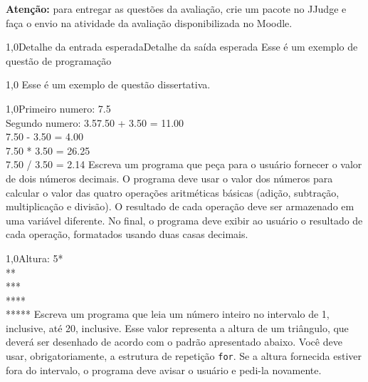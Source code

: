 \documentclass[
    12pt,     
    openright,
    twoside,  
    a4paper,  
    english,  
    brazil,   
]{memoir}
\begin{document}
\mainmatter



\textbf{Atenção:} para entregar as questões da avaliação, crie um pacote no JJudge e faça o envio na atividade da avaliação disponibilizada no Moodle.



\begin{questaoProgramacao}{1,0}{Detalhe da entrada esperada}{Detalhe da saída esperada}
    Esse é um exemplo de questão de programação
\end{questaoProgramacao}



\begin{questaoDissertativa}{1,0}
    Esse é um exemplo de questão dissertativa.
    
\end{questaoDissertativa}



\begin{questaoProgramacao}{1,0}{Primeiro numero: 7.5\\Segundo numero: 3.5}{7.50 + 3.50 = 11.00\\7.50 - 3.50 = 4.00\\7.50 * 3.50 = 26.25\\7.50 / 3.50 = 2.14}
    Escreva um programa que peça para o usuário fornecer o valor de dois números decimais. O programa deve usar o valor dos números para calcular o valor das quatro operações aritméticas básicas (adição, subtração, multiplicação e divisão). O resultado de cada operação deve ser armazenado em uma variável diferente. No final, o programa deve exibir ao usuário o resultado de cada operação, formatados usando duas casas decimais.
\end{questaoProgramacao}



\begin{questaoProgramacao}{1,0}{Altura: 5}{*\\
**\\
***\\
****\\
*****}
    Escreva um programa que leia um número inteiro no intervalo de 1, inclusive, até 20, inclusive. Esse valor representa a altura de um triângulo, que deverá ser desenhado de acordo com o padrão apresentado abaixo. Você deve usar, obrigatoriamente, a estrutura de repetição \texttt{for}. Se a altura fornecida estiver fora do intervalo, o programa deve avisar o usuário e pedi-la novamente.
\end{questaoProgramacao}
\end{document}

